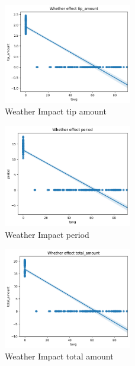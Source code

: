 \documentclass[11pt]{article}
\begin{document}
\begin{figure}[!h]
    \centering
    \includegraphics[width=0.5\textwidth]{plots/p6.png}
    \caption{Weather Impact tip amount} %
    \label{fig:image3}
\end{figure}


\begin{figure}[!h]
    \centering
    \includegraphics[width=0.5\textwidth]{plots/p7.png}
    \caption{Weather Impact period} %
    \label{fig:image3}
\end{figure}

\begin{figure}[!h]
    \centering
    \includegraphics[width=0.5\textwidth]{plots/p8.png}
    \caption{Weather Impact total amount} %
    \label{fig:image3}
\end{figure}
\end{document}
